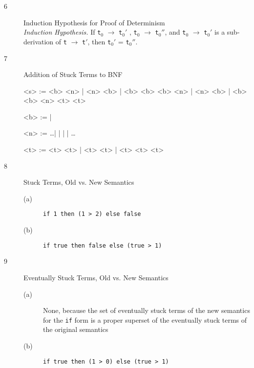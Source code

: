 \documentclass{article}
\begin{document}
\begin{description}
  \item[6]{Induction Hypothesis for Proof of Determinism}
    \vspace{0.3cm}\\
    \textit{Induction Hypothesis.} If \verb|t|$_0$ $\longrightarrow$ \verb|t|$_0'$ , \verb|t|$_0$ $\longrightarrow$ \verb|t|$_0''$, and \verb|t|$_0$ $\longrightarrow$ \verb|t|$_0'$ is a sub-derivation of \verb|t| $\longrightarrow$ \verb|t|$'$, then \verb|t|$_0'$ = \verb|t|$_0''$.

  \item[7]{Addition of Stuck Terms to BNF}

    \begin{grammar}
      <s> :=  <b>  \lit*{+} <n> | <n> \lit*{+} <b> | <b> \lit*{+} <b>
      \alt <b>  \lit*{>} <n> | <n> \lit*{>} <b> | <b> \lit*{>} <b>
      \alt {} <n>  <t>  <t>

      <b> :=  | 

      <n> := \ldots |  |  |  | \ldots

      <t> := <t> \lit*{+} <t> | <t> \lit*{>} <t> |  <t>  <t>  <t>
    \end{grammar}

  \item[8]{Stuck Terms, Old vs. New Semantics}
    \begin{description}
      \item[(a)] \verb|if 1 then (1 > 2) else false|
      \item[(b)] \verb|if true then false else (true > 1)|
    \end{description}

  \item[9]{Eventually Stuck Terms, Old vs. New Semantics}
    \begin{description}
      \item[(a)] None, because the set of eventually stuck terms of the new semantics for the \verb|if| form is a proper superset of the eventually stuck terms of the original semantics
      \item[(b)] \verb|if true then (1 > 0) else (true > 1)|
    \end{description}


\end{description}
\end{document}
